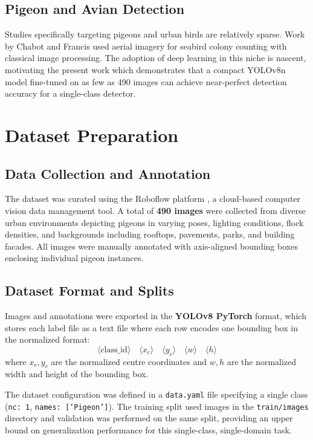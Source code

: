 \documentclass[journal]{IEEEtran}
\begin{document}
\subsection{Pigeon and Avian Detection}
Studies specifically targeting pigeons and urban birds are relatively sparse. Work by Chabot and Francis \cite{chabot2016computer} used aerial imagery for seabird colony counting with classical image processing. The adoption of deep learning in this niche is nascent, motivating the present work which demonstrates that a compact YOLOv8n model fine-tuned on as few as 490 images can achieve near-perfect detection accuracy for a single-class detector.

\section{Dataset Preparation}
\label{sec:dataset}

\subsection{Data Collection and Annotation}
The dataset was curated using the Roboflow platform \cite{roboflow}, a cloud-based computer vision data management tool. A total of \textbf{490 images} were collected from diverse urban environments depicting pigeons in varying poses, lighting conditions, flock densities, and backgrounds including rooftops, pavements, parks, and building facades. All images were manually annotated with axis-aligned bounding boxes enclosing individual pigeon instances.

\subsection{Dataset Format and Splits}
Images and annotations were exported in the \textbf{YOLOv8 PyTorch} format, which stores each label file as a text file where each row encodes one bounding box in the normalized format:
\[
\langle \text{class\_id} \rangle \quad \langle x_c \rangle \quad \langle y_c \rangle \quad \langle w \rangle \quad \langle h \rangle
\]
where \( x_c, y_c \) are the normalized centre coordinates and \( w, h \) are the normalized width and height of the bounding box.

The dataset configuration was defined in a \texttt{data.yaml} file specifying a single class (\texttt{nc: 1}, \texttt{names: ['Pigeon']}). The training split used images in the \texttt{train/images} directory and validation was performed on the same split, providing an upper bound on generalization performance for this single-class, single-domain task.
\end{document}
